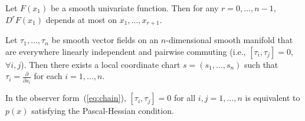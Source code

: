 \documentclass[10pt,a4paper]{amsart}
\begin{document}
\begin{lemma}\label{lem-1}
	Let $F(x_1)$ be a smooth univariate function. Then for any $r=0,\ldots,n-1$, $D^r F(x_1)$ depends at most on $x_1,\ldots,x_{r+1}$.   
\end{lemma}

\begin{lemma}\label{lem:straightening}
	Let $\tau_1,\ldots,\tau_n$ be smooth vector fields on an $n$-dimensional smooth manifold that are everywhere linearly independent and pairwise commuting (i.e., $[\tau_i,\tau_j]=0$, $\forall i,j$). Then there exists a local coordinate chart $s=(s_1,\ldots,s_n)$ such that $\tau_i=\frac{\partial}{\partial s_i}$ for each $i=1,\ldots,n$.
\end{lemma}

\begin{theorem}\label{thm:Lie_PH_equiv}
	In the observer form~(\ref{eq:chain}), $[\tau_i,\tau_j]=0$ for all $i,j=1,\ldots,n$ is equivalent to $p(x)$ satisfying the Pascal-Hessian condition.
\end{theorem}
\end{document}
